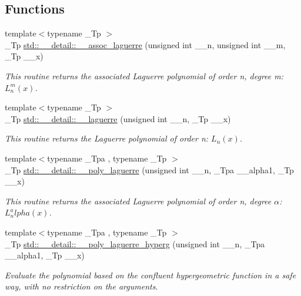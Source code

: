 \subsection*{Functions}
\begin{DoxyCompactItemize}
\item 
{\footnotesize template$<$typename \+\_\+\+Tp $>$ }\\\+\_\+\+Tp \hyperlink{namespacestd_1_1____detail_a7d47c4512f7c6914f5504fde6ffa31fb}{std\+::\+\_\+\+\_\+detail\+::\+\_\+\+\_\+assoc\+\_\+laguerre} (unsigned int \+\_\+\+\_\+n, unsigned int \+\_\+\+\_\+m, \+\_\+\+Tp \+\_\+\+\_\+x)
\begin{DoxyCompactList}\small\item\em This routine returns the associated Laguerre polynomial of order n, degree m\+: $ L_n^m(x) $. \end{DoxyCompactList}\item 
{\footnotesize template$<$typename \+\_\+\+Tp $>$ }\\\+\_\+\+Tp \hyperlink{namespacestd_1_1____detail_aa714c4983a3cb7d9d18e0c2c5a8f6826}{std\+::\+\_\+\+\_\+detail\+::\+\_\+\+\_\+laguerre} (unsigned int \+\_\+\+\_\+n, \+\_\+\+Tp \+\_\+\+\_\+x)
\begin{DoxyCompactList}\small\item\em This routine returns the Laguerre polynomial of order n\+: $ L_n(x) $. \end{DoxyCompactList}\item 
{\footnotesize template$<$typename \+\_\+\+Tpa , typename \+\_\+\+Tp $>$ }\\\+\_\+\+Tp \hyperlink{namespacestd_1_1____detail_a76704115fd45b240802f4ccc433bb033}{std\+::\+\_\+\+\_\+detail\+::\+\_\+\+\_\+poly\+\_\+laguerre} (unsigned int \+\_\+\+\_\+n, \+\_\+\+Tpa \+\_\+\+\_\+alpha1, \+\_\+\+Tp \+\_\+\+\_\+x)
\begin{DoxyCompactList}\small\item\em This routine returns the associated Laguerre polynomial of order n, degree $ \alpha $\+: $ L_n^alpha(x) $. \end{DoxyCompactList}\item 
{\footnotesize template$<$typename \+\_\+\+Tpa , typename \+\_\+\+Tp $>$ }\\\+\_\+\+Tp \hyperlink{namespacestd_1_1____detail_a1c817d7f5df1147829ad745176325cd6}{std\+::\+\_\+\+\_\+detail\+::\+\_\+\+\_\+poly\+\_\+laguerre\+\_\+hyperg} (unsigned int \+\_\+\+\_\+n, \+\_\+\+Tpa \+\_\+\+\_\+alpha1, \+\_\+\+Tp \+\_\+\+\_\+x)
\begin{DoxyCompactList}\small\item\em Evaluate the polynomial based on the confluent hypergeometric function in a safe way, with no restriction on the arguments. \end{DoxyCompactList}\item 

\end{DoxyCompactItemize}

